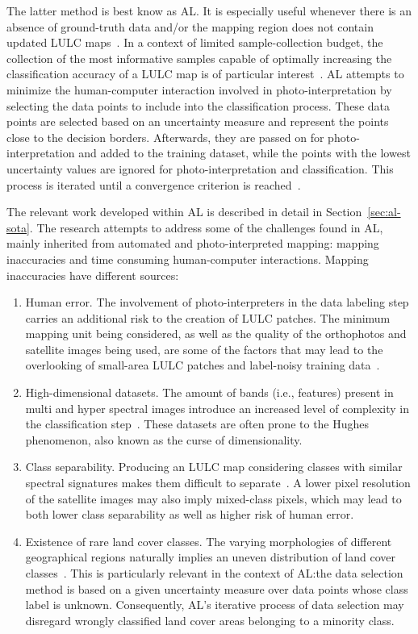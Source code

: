 \documentclass[parskip=full]{scrartcl}
\begin{document}
The latter method is best know as AL\@. It is especially useful whenever there is
an absence of ground-truth data and/or the mapping region does not contain
updated LULC maps~\cite{Su2020}. In a context of limited sample-collection
budget, the collection of the most informative samples capable of optimally
increasing the classification accuracy of a LULC map is of particular
interest~\cite{Su2020}. AL attempts to minimize the human-computer interaction
involved in photo-interpretation by selecting the data points to include into
the classification process.  These data points are selected based on an
uncertainty measure and represent the points close to the decision borders.
Afterwards, they are passed on for photo-interpretation and added to the
training dataset, while the points with the lowest uncertainty values are
ignored for photo-interpretation and classification. This process is iterated
until a convergence criterion is reached~\cite{Pasolli2016}. 

The relevant work developed within AL is described in detail in Section~\ref{sec:al-sota}.
The research attempts to address some of the challenges found in AL, mainly inherited from
automated and photo-interpreted mapping: mapping inaccuracies and time consuming
human-computer interactions. 
Mapping inaccuracies have different sources:

\begin{enumerate}
    \item Human error. The involvement of photo-interpreters in the data
        labeling step carries an additional risk to the creation of LULC
        patches. The minimum mapping unit being considered, as well as the
        quality of the orthophotos and satellite images being used, are some of
        the factors that may lead to the overlooking of small-area LULC patches
        and label-noisy training data~\cite{Pelletier2017}.
    \item High-dimensional datasets. The amount of bands (i.e., features)
        present in multi and hyper spectral images introduce an increased level
        of complexity in the classification step~\cite{Stromann2020}. These
        datasets are often prone to the Hughes phenomenon, also known as the
        curse of dimensionality. 
    \item Class separability. Producing an LULC map considering classes with
        similar spectral signatures makes them difficult to
        separate~\cite{Alonso-Sarria2019}. A lower pixel resolution of the
        satellite images may also imply mixed-class pixels, which may lead to
        both lower class separability as well as higher risk of human error.
    \item Existence of rare land cover classes. The varying morphologies of
        different geographical regions naturally implies an uneven distribution
        of land cover classes~\cite{Feng2018}. This is particularly relevant in
        the context of AL:\@ the data selection method is based on a given
        uncertainty measure over data points whose class label is unknown.
        Consequently, AL's iterative process of data selection may disregard
        wrongly classified land cover areas belonging to a minority class.
\end{enumerate}
\end{document}
